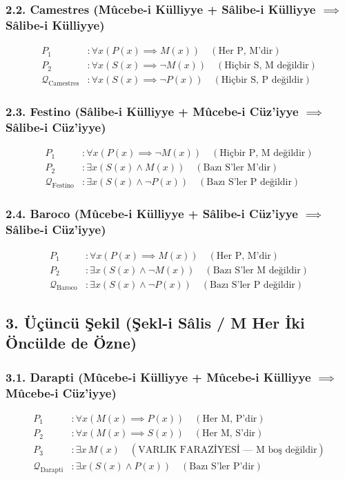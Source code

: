\documentclass[11pt, a4paper]{article}
\begin{document}
\subsubsection{2.2. Camestres (Mûcebe-i Külliyye + Sâlibe-i Külliyye $\implies$ Sâlibe-i Külliyye)}
\begin{align}
P_1 &: \forall x (P(x) \implies M(x)) \quad (\text{Her P, M'dir}) \\
P_2 &: \forall x (S(x) \implies \neg M(x)) \quad (\text{Hiçbir S, M değildir}) \\
\mathcal{Q}_{\text{Camestres}} &: \forall x (S(x) \implies \neg P(x)) \quad (\text{Hiçbir S, P değildir})
\end{align}

\subsubsection{2.3. Festino (Sâlibe-i Külliyye + Mûcebe-i Cüz'iyye $\implies$ Sâlibe-i Cüz'iyye)}
\begin{align}
P_1 &: \forall x (P(x) \implies \neg M(x)) \quad (\text{Hiçbir P, M değildir}) \\
P_2 &: \exists x (S(x) \land M(x)) \quad (\text{Bazı S'ler M'dir}) \\
\mathcal{Q}_{\text{Festino}} &: \exists x (S(x) \land \neg P(x)) \quad (\text{Bazı S'ler P değildir})
\end{align}

\subsubsection{2.4. Baroco (Mûcebe-i Külliyye + Sâlibe-i Cüz'iyye $\implies$ Sâlibe-i Cüz'iyye)}
\begin{align}
P_1 &: \forall x (P(x) \implies M(x)) \quad (\text{Her P, M'dir}) \\
P_2 &: \exists x (S(x) \land \neg M(x)) \quad (\text{Bazı S'ler M değildir}) \\
\mathcal{Q}_{\text{Baroco}} &: \exists x (S(x) \land \neg P(x)) \quad (\text{Bazı S'ler P değildir})
\end{align}

\subsection{3. Üçüncü Şekil (Şekl-i Sâlis / M Her İki Öncülde de Özne)}

\subsubsection{3.1. Darapti (Mûcebe-i Külliyye + Mûcebe-i Külliyye $\implies$ Mûcebe-i Cüz'iyye)}
\begin{align}
P_1 &: \forall x (M(x) \implies P(x)) \quad (\text{Her M, P'dir}) \\
P_2 &: \forall x (M(x) \implies S(x)) \quad (\text{Her M, S'dir}) \\
P_3 &: \exists x \, M(x) \quad (\text{VARLIK FARAZİYESİ --- M boş değildir}) \\
\mathcal{Q}_{\text{Darapti}} &: \exists x (S(x) \land P(x)) \quad (\text{Bazı S'ler P'dir})
\end{align}
\end{document}
